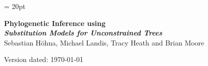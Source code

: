 \documentclass[11pt]{article}
\begin{document}
\renewcommand{\headrulewidth}{0.5pt}
\headsep = 20pt
\lhead{ }

\thispagestyle{plain}
\begin{center}

\textbf{\LARGE Phylogenetic Inference using \RevBayes}\\\vspace{2mm}
\textbf{\it{\Large Substitution Models for Unconstrained Trees}}\\\vspace{2mm}
\vspace{1cm}
{\Large Sebastian H{\"o}hna, Michael Landis, Tracy Heath and Brian Moore}
\vspace{1cm}
\end{center}

\def \ResourcePath {./}
\def \GlobalResourcePath {../}


Version dated: \today
\end{document}
